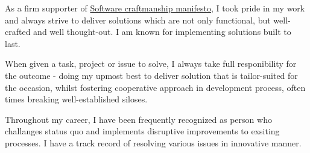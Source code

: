\documentclass[9pt]{style/developercv}
\begin{document}
\begin{minipage}[t]{0.3\textwidth}
	\vspace{-\baselineskip}


	As a firm supporter of \href{https://manifesto.softwarecraftmanship.org/}{Software craftmanship manifesto},
	I took pride in my work and always strive to deliver solutions which are not only functional, 
	but well-crafted and well thought-out. I am known for implementing solutions built to last.

\end{minipage}
\hfill
\begin{minipage}[t]{0.3\textwidth}
	\vspace{-\baselineskip}
	
	
	When given a task, project or issue to solve, I always take full responibility for the outcome - doing my upmost
	best to deliver solution that is tailor-suited for the occasion, whilst fostering cooperative approach in development
	process, often times breaking well-established siloses.
\end{minipage}
\hfill
\begin{minipage}[t]{0.3\textwidth}
	\vspace{-\baselineskip}
	
	
	Throughout my career, I have been frequently recognized as person who challanges status quo and implements disruptive
	improvements to exsiting processes. I have a track record of resolving various issues in innovative manner. 
\end{minipage}

\vspace{0.75cm}


\end{document}
